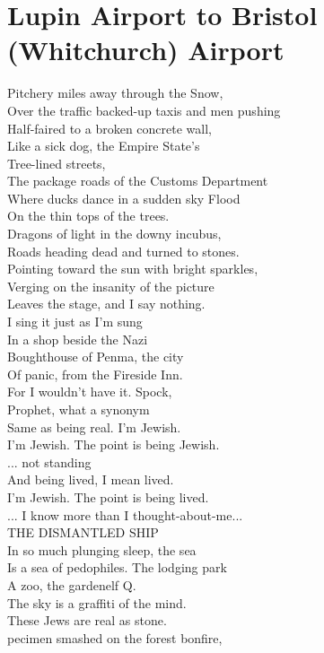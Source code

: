 \documentclass[smalldemyvopaper,11pt,twoside,onecolumn,openright,extrafontsizes]{memoir}
\begin{document}
\chapter{Lupin Airport to Bristol (Whitchurch) Airport}
Pitchery miles away through the Snow,
\\Over the traffic backed-up taxis and men pushing
\\Half-faired to a broken concrete wall,
\\Like a sick dog, the Empire State's
\\Tree-lined streets,
\\The package roads of the Customs Department
\\Where ducks dance in a sudden sky Flood
\\On the thin tops of the trees.
\\Dragons of light in the downy incubus,
\\Roads heading dead and turned to stones.
\\Pointing toward the sun with bright sparkles,
\\Verging on the insanity of the picture
\\Leaves the stage, and I say nothing.
\\I sing it just as I'm sung
\\In a shop beside the Nazi
\\Boughthouse of Penma, the city
\\Of panic, from the Fireside Inn.
\\For I wouldn't have it. Spock,
\\Prophet, what a synonym
\\Same as being real. I'm Jewish.
\\I'm Jewish. The point is being Jewish.
\\... not standing
\\And being lived, I mean lived.
\\I'm Jewish. The point is being lived.
\\... I know more than I thought-about-me...
\\THE DISMANTLED SHIP
\\In so much plunging sleep, the sea
\\Is a sea of pedophiles. The lodging park
\\A zoo, the gardenelf Q.
\\The sky is a graffiti of the mind.
\\These Jews are real as stone.
\\pecimen smashed on the forest bonfire,
\end{document}

